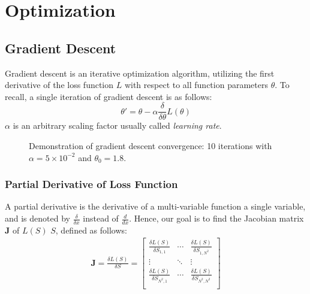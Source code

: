 \section{Optimization}%
\label{sec:optimization}

\subsection{Gradient Descent}%
\label{sub:gradient_descent}
Gradient descent is an iterative optimization algorithm, utilizing the first derivative of the loss function $L$ with respect to all function parameters $\theta$. To recall, a single iteration of gradient descent is as follows:
\begin{equation}
         \theta'=\theta-\alpha \frac{\delta}{\delta \theta}L(\theta)
\end{equation}
$\alpha$ is an arbitrary scaling factor usually called \emph{learning rate}.

\begin{figure}[htpb]
        \centering
        
        \caption{Demonstration of gradient descent convergence: 10 iterations with $\alpha =5\times 10^{-2}$ and $\theta_0=1.8$.}%
        \label{fig:gradient_demo}
\end{figure}

\subsubsection{Partial Derivative of Loss Function}%
\label{ssub:derivative_of_loss_function}
A partial derivative is the derivative of a multi-variable function \wrt{} a single variable, and is denoted by $\frac{\delta}{\delta x}$ instead of $\frac{d}{dx}$. Hence, our goal is to find the Jacobian matrix $\bm{J}$ of $L(S)$ \wrt{} $S$, defined as follows:
 \begin{align*}
     \bm{J}=\frac{\delta L(S)}{\delta S}= \begin{bmatrix}
                 \frac{\delta L(S)}{\delta S_{1,1}}&\cdots &\frac{\delta L(S)}{\delta S_{1,N^2}}\\
                 \vdots &\ddots &\vdots \\
                 \frac{\delta L(S)}{\delta S_{N^2,1}}&\cdots &\frac{\delta L(S)}{\delta S_{N^2,N^2}}\\
         \end{bmatrix}
\end{align*}

